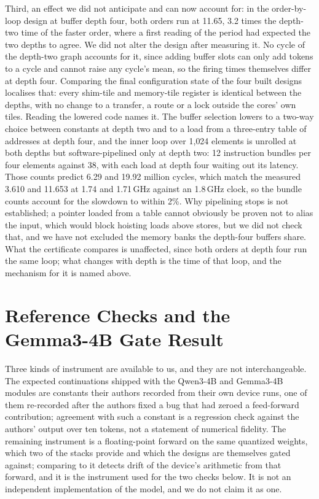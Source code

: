 Third, an effect we did not anticipate and can now account for: in the order-by-loop
design at buffer depth four, both orders run at 11.65\ms, 3.2 times the depth-two time of the faster order, where a first
reading of the period had expected the two depths to agree. We did not alter the design after measuring it. No cycle of the depth-two graph accounts for it, since adding buffer slots can only add tokens to a cycle
and cannot raise any cycle's mean, so the firing times themselves differ at depth four. Comparing the final
configuration state of the four built designs localises that: every shim-tile and memory-tile register is identical
between the depths, with no change to a transfer, a route or a lock outside the cores' own tiles. Reading the lowered
code names it. The buffer selection lowers to a two-way choice between constants at depth two and to a load from a
three-entry table of addresses at depth four, and the inner loop over 1{,}024 elements is unrolled at both depths but
software-pipelined only at depth two: 12 instruction bundles per four elements against 38, with each load at depth four
waiting out its latency. Those counts predict 6.29 and 19.92 million cycles, which match the measured 3.610\ms{} and
11.653\ms{} at 1.74 and 1.71\,GHz against an 1.8\,GHz clock, so the bundle counts account for the slowdown to within
2\%. Why pipelining stops is not established; a pointer loaded from a table cannot obviously be proven not to alias the
input, which would block hoisting loads above stores, but we did not check that, and we have not excluded the memory
banks the depth-four buffers share. What the certificate compares is unaffected, since both orders at depth four run
the same loop; what changes with depth is the time of that loop, and the mechanism for it is named above.

\section{Reference Checks and the Gemma3-4B Gate Result}
\label{app:gemma-gate}

Three kinds of instrument are available to us, and they are not interchangeable. The expected continuations shipped
with the Qwen3-4B and Gemma3-4B modules are constants their authors recorded from their own device runs, one of them
re-recorded after the authors fixed a bug that had zeroed a feed-forward contribution; agreement with such a constant
is a regression check against the authors' output over ten tokens, not a statement of numerical fidelity. The
remaining instrument is a floating-point forward on the same quantized weights, which two of the stacks provide and
which the designs are themselves gated against; comparing to it detects drift of the device's arithmetic from that
forward, and it is the instrument used for the two checks below. It is not an independent implementation of the
model, and we do not claim it as one.

